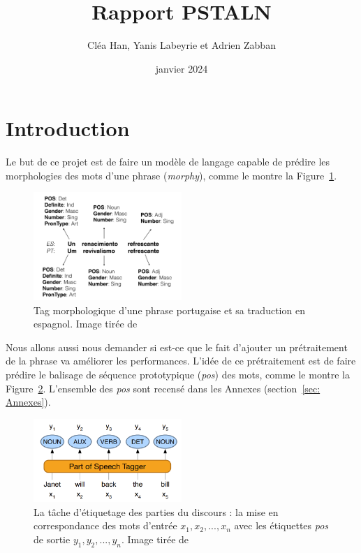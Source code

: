\documentclass[a4paper]{article}
\title{Rapport PSTALN}
\author{Cléa Han, Yanis Labeyrie et Adrien Zabban}
\date{janvier 2024}
\begin{document}
\maketitle
\bigskip
\tableofcontents
\newpage

\section{Introduction}

Le but de ce projet est de faire un modèle de langage capable de prédire les morphologies des mots d'une phrase
(\textit{morphy}), comme le montre la Figure~\ref{fig: example morphy}.

\begin{figure}[H]
    \centering
    \includegraphics[width=0.5\textwidth]{morphy.png}
    \caption{Tag morphologique d'une phrase portugaise et sa traduction en espagnol.
    Image tirée de~\cite{malaviya-etal-2018-neural}}
    \label{fig: example morphy}
\end{figure}    

Nous allons aussi nous demander si est-ce que le fait d'ajouter un prétraitement de la phrase va améliorer
les performances. L'idée de ce prétraitement est de faire prédire le balisage de séquence
prototypique (\textit{pos}) des mots, comme le montre la Figure~\ref{fig: example pos}. L'ensemble des \textit{pos} 
sont recensé dans les Annexes (section~\ref{sec: Annexes}).

\begin{figure}[H]
    \centering
    \includegraphics[width=0.5\textwidth]{pos.png}
    \caption{La tâche d'étiquetage des parties du discours : la mise en correspondance des mots d'entrée 
    $x_1, x_2,..., x_n$ avec les étiquettes \textit{pos} de sortie $y_1, y_2,..., y_n$.
    Image tirée de~\cite{pos}}
    \label{fig: example pos}
\end{figure} 
\end{document}

